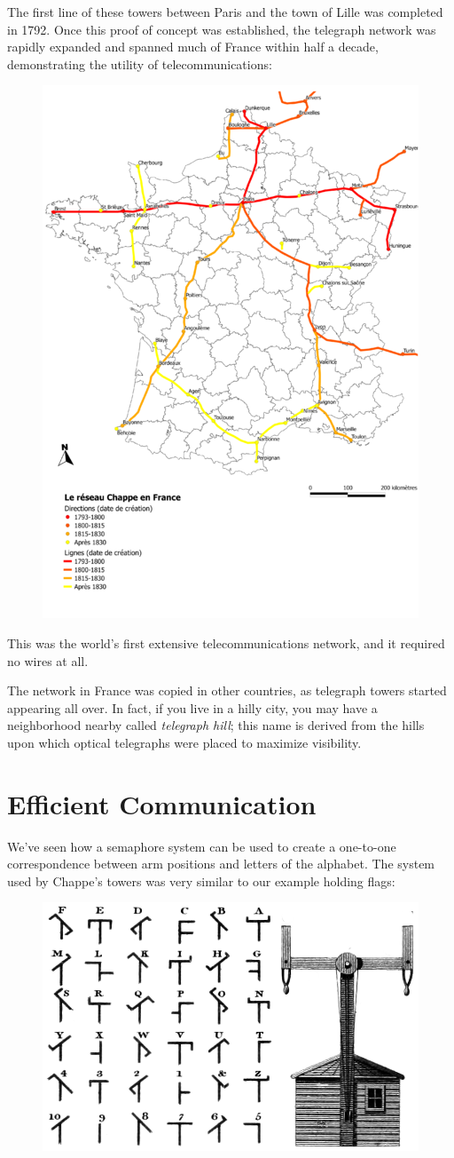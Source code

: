 \documentclass[UTF8]{book}
\begin{document}
\begin{CJK}{UTF8}{gbsn}
The first line of these towers between Paris and the town of Lille was completed in 1792. Once this proof of concept was established, the telegraph network was rapidly expanded and spanned much of France within half a decade, demonstrating the utility of telecommunications:

\begin{figure}[H]
\centering
\includegraphics[width=0.5\linewidth]{chappe_network}
\end{figure}

This was the world's first extensive telecommunications network, and it required no wires at all.

The network in France was copied in other countries, as telegraph towers started appearing all over. In fact, if you live in a hilly city, you may have a neighborhood nearby called \emph{telegraph hill}; this name is derived from the hills upon which optical telegraphs were placed to maximize visibility.

\section{Efficient Communication}

We've seen how a semaphore system can be used to create a one-to-one correspondence between arm positions and letters of the alphabet. The system used by Chappe's towers was very similar to our example holding flags:

\begin{figure}[H]
\centering
\includegraphics[width=0.5\linewidth]{chappe_telegraph_system}
\end{figure}


\end{CJK}
\end{document}
